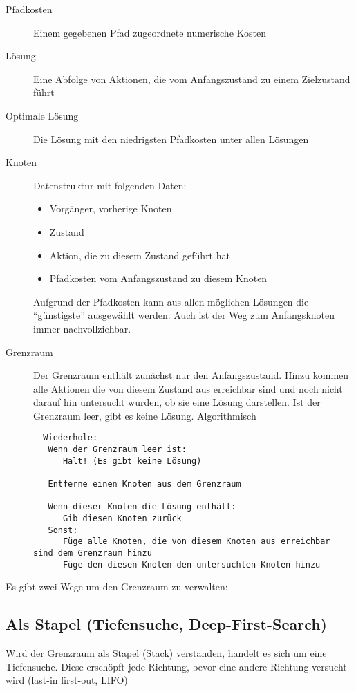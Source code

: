 \begin{description}
 \item [Pfadkosten] Einem gegebenen Pfad zugeordnete numerische Kosten

 \item [Lösung] Eine Abfolge von Aktionen, die vom Anfangszustand zu einem Zielzustand führt
 \item [Optimale Lösung] Die Lösung mit den niedrigsten Pfadkosten unter allen Lösungen
 \item [Knoten] Datenstruktur mit folgenden Daten:
      \begin{itemize}
      \item Vorgänger, vorherige Knoten
      \item Zustand
      \item Aktion, die zu diesem Zustand geführt hat
      \item Pfadkosten vom Anfangszustand zu diesem Knoten
      \end{itemize}

      Aufgrund der Pfadkosten kann aus allen möglichen Lösungen die \enquote{günstigste} ausgewählt werden. Auch ist der Weg zum Anfangsknoten immer nachvollziehbar.

 \item [Grenzraum] Der Grenzraum enthält zunächst nur den Anfangszustand. Hinzu kommen alle Aktionen die von diesem Zustand aus erreichbar sind und noch nicht darauf hin untersucht wurden, ob sie eine Lösung darstellen. Ist der Grenzraum leer, gibt es keine Lösung. Algorithmisch
 \begin{lstlisting}
  Wiederhole:
   Wenn der Grenzraum leer ist:
      Halt! (Es gibt keine Lösung)
   
   Entferne einen Knoten aus dem Grenzraum
   
   Wenn dieser Knoten die Lösung enthält:
      Gib diesen Knoten zurück
   Sonst:
      Füge alle Knoten, die von diesem Knoten aus erreichbar sind dem Grenzraum hinzu
      Füge den diesen Knoten den untersuchten Knoten hinzu
 \end{lstlisting}

\end{description}

Es gibt zwei Wege um den Grenzraum zu verwalten:

\subsection{Als Stapel (Tiefensuche, Deep-First-Search)}

Wird der Grenzraum als Stapel (Stack) verstanden, handelt es sich um eine Tiefensuche. Diese erschöpft jede Richtung, bevor eine andere Richtung versucht wird (last-in first-out, LIFO)

